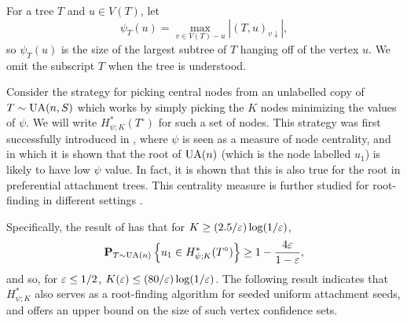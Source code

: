 For a tree $T$ and $u \in V(T)$, let 
\[
  \psi_T(u) = \max_{v \in V(T) - u} |(T, u)_{v \downarrow}| ,
\]
so $\psi_T(u)$ is the size of the largest subtree of $T$ hanging off
of the vertex $u$. We omit the subscript $T$ when the tree is
understood.

Consider the strategy for picking central nodes from an unlabelled
copy of $T \sim \operatorname{UA}(n, S)$ which works by simply picking the $K$ nodes
minimizing the values of $\psi$. We will write
$H^*_{\psi; K}(T^\circ)$ for such a set of nodes. This strategy was
first successfully introduced in \cite{finding-adam}, where $\psi$ is
seen as a measure of node centrality, and in which it is shown that
the root of $\operatorname{UA}(n)$ (which is the node labelled $u_1$) is likely to
have low $\psi$ value. In fact, it is shown that this is also true for
the root in preferential attachment trees. This centrality measure is
further studied for root-finding in different settings
\cite{ling-centrality,jog-persistence,khim-confidence}.

Specifically, the result of \cite[Theorem 3]{finding-adam} has that
for $K \ge (2.5/\varepsilon) \log(1/\varepsilon)$,
\[
  \operatorname{\mathbf{P}}_{T \sim \operatorname{UA}(n)}\Big\{u_1 \in H^*_{\psi; K}(T^\circ)\Big\} \ge 1 - \frac{4 \varepsilon}{1 - \varepsilon} ,
\]
and so, for $\varepsilon \le 1/2$, $K(\varepsilon) \le (80/\varepsilon) \log(1/\varepsilon)$. The
following result indicates that $H^*_{\psi; K}$ also serves as a
root-finding algorithm for seeded uniform attachment seeds, and offers
an upper bound on the size of such vertex confidence sets.

